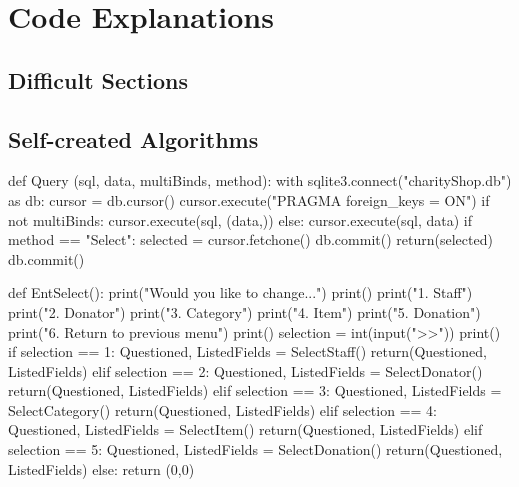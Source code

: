 \section{Code Explanations}

\subsection{Difficult Sections}

\subsection{Self-created Algorithms}
\begin{python}
def Query (sql, data, multiBinds, method):
    with sqlite3.connect("charityShop.db") as db:
        cursor = db.cursor()
        cursor.execute("PRAGMA foreign_keys = ON")
        if not multiBinds:
            cursor.execute(sql, (data,))
        else:
            cursor.execute(sql, data)
        if method == "Select":
            selected = cursor.fetchone()
            db.commit()
            return(selected)
        db.commit()



def EntSelect():
    print("Would you like to change...")
    print()
    print("1. Staff")
    print("2. Donator")
    print("3. Category")
    print("4. Item")
    print("5. Donation")
    print("6. Return to previous menu")
    print()
    selection = int(input(">>"))
    print()
    if selection == 1:
        Questioned, ListedFields = SelectStaff()
        return(Questioned, ListedFields)
    elif selection == 2:
        Questioned, ListedFields = SelectDonator()
        return(Questioned, ListedFields)
    elif selection == 3:
        Questioned, ListedFields = SelectCategory()
        return(Questioned, ListedFields)
    elif selection == 4:
        Questioned, ListedFields = SelectItem()
        return(Questioned, ListedFields)
    elif selection == 5:
        Questioned, ListedFields = SelectDonation()
        return(Questioned, ListedFields)
    else:
        return (0,0)


\end{python}
